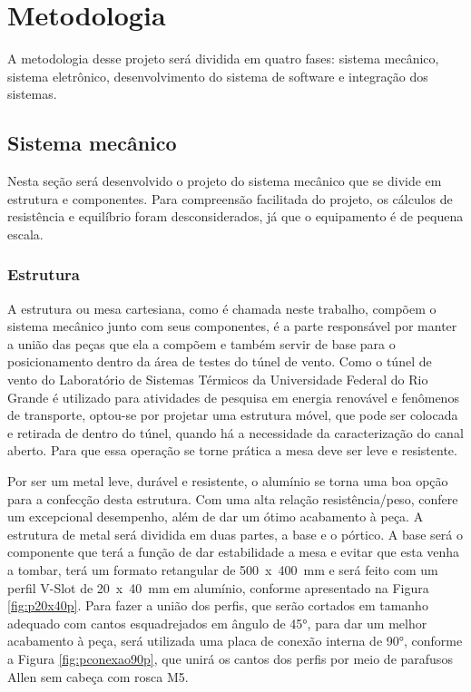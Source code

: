 \chapter{Metodologia}\label{ch:metodologia}

A metodologia desse projeto será dividida em quatro fases: sistema mecânico, sistema eletrônico, 
desenvolvimento do sistema de software e integração dos sistemas.

\section{Sistema mecânico}\label{sec:metmecanico}

Nesta seção será desenvolvido o projeto do sistema mecânico que se divide em estrutura e componentes. 
Para compreensão facilitada do projeto, os cálculos de resistência e equilíbrio foram desconsiderados, 
já que o equipamento é de pequena escala.

\subsection{Estrutura}\label{subsec:metestrutura}

A estrutura ou mesa cartesiana, como é chamada neste trabalho, compõem o sistema mecânico junto com seus 
componentes, é a parte responsável por manter a união das peças que ela a compõem e também servir de base 
para o posicionamento dentro da área de testes do túnel de vento. Como o túnel de vento do Laboratório de 
Sistemas Térmicos da Universidade Federal do Rio Grande é utilizado para atividades de pesquisa em energia 
renovável e fenômenos de transporte, optou-se por projetar uma estrutura móvel, que pode ser colocada e 
retirada de dentro do túnel, quando há a necessidade da caracterização do canal aberto. Para que essa 
operação se torne prática a mesa deve ser leve e resistente.

Por ser um metal leve, durável e resistente, o alumínio se torna uma boa opção para a confecção desta 
estrutura. Com uma alta relação resistência/peso, confere um excepcional desempenho, além de dar um ótimo 
acabamento à peça. A estrutura de metal será dividida em duas partes, a base e o pórtico. A base será 
o componente que terá a função de dar estabilidade a mesa e evitar que esta venha a tombar, terá um 
formato retangular de 500~x~400~mm e será feito com um perfil V-Slot de 20~x~40~mm em alumínio, conforme 
apresentado na Figura \ref{fig:p20x40p}. 
Para fazer a união dos perfis, que serão cortados em tamanho adequado com cantos esquadrejados em 
ângulo de 45°, para dar um melhor acabamento à peça, será utilizada uma placa de conexão 
interna de 90°, conforme a Figura \ref{fig:pconexao90p}, que unirá os cantos dos perfis por 
meio de parafusos Allen sem cabeça com rosca M5.
    
